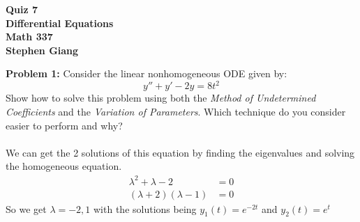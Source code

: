\documentclass[12pt]{article}
\begin{document}
	
	\begin{center}
		\textbf{Quiz 7} \\
		\textbf{Differential Equations} \\
		\textbf{Math 337} \\
		\textbf{Stephen Giang} \\
	\end{center}

\noindent \textbf{Problem 1: }Consider the linear nonhomogeneous ODE given by:
	$$
	y'' + y' - 2y = 8t^2
	$$
Show how to solve this problem using both the \textit{Method of Undetermined Coefficients} and the \textit{Variation of Parameters}. Which technique do you consider easier to perform and why?
\\ \\
We can get the 2 solutions of this equation by finding the eigenvalues and solving the homogeneous equation.
	\begin{align*}
		\lambda^2 + \lambda - 2 &= 0 \\
		(\lambda + 2)(\lambda - 1) &= 0 
	\end{align*}	
So we get $\lambda = -2,1$ with the solutions being $y_1(t) = e^{-2t}$ and $y_2(t) = e^{t}$
\newpage
\end{document}
